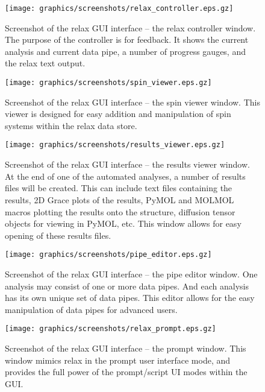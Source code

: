\begin{figure}
\centerline{\texttt{[image: graphics/screenshots/relax\_controller.eps.gz]}}
\caption[relax controller screenshot]{Screenshot of the relax GUI interface -- the relax controller window.  The purpose of the controller is for feedback.  It shows the current analysis and current data pipe, a number of progress gauges, and the relax text output.}\label{fig: screenshot: relax controller}
\end{figure}

\begin{figure}
\centerline{\texttt{[image: graphics/screenshots/spin\_viewer.eps.gz]}}
\caption[Spin viewer window screenshot]{Screenshot of the relax GUI interface -- the spin viewer window.  This viewer is designed for easy addition and manipulation of spin systems within the relax data store.}\label{fig: screenshot: spin viewer}
\end{figure}

\begin{figure}
\centerline{\texttt{[image: graphics/screenshots/results\_viewer.eps.gz]}}
\caption[Results viewer window screenshot]{Screenshot of the relax GUI interface -- the results viewer window.  At the end of one of the automated analyses, a number of results files will be created.  This can include text files containing the results, 2D Grace plots of the results, PyMOL and MOLMOL macros plotting the results onto the structure, diffusion tensor objects for viewing in PyMOL, etc.  This window allows for easy opening of these results files.}\label{fig: screenshot: results viewer}
\end{figure}

\begin{figure}
\centerline{\texttt{[image: graphics/screenshots/pipe\_editor.eps.gz]}}
\caption[Pipe editor window screenshot]{Screenshot of the relax GUI interface -- the pipe editor window.  One analysis may consist of one or more data pipes.  And each analysis has its own unique set of data pipes.  This editor allows for the easy manipulation of data pipes for advanced users.}\label{fig: screenshot: pipe editor}
\end{figure}

\begin{figure}
\centerline{\texttt{[image: graphics/screenshots/relax\_prompt.eps.gz]}}
\caption[Prompt window screenshot]{Screenshot of the relax GUI interface -- the prompt window.  This window mimics relax in the prompt user interface mode, and provides the full power of the prompt/script UI modes within the GUI.}\label{fig: screenshot: prompt window}
\end{figure}


